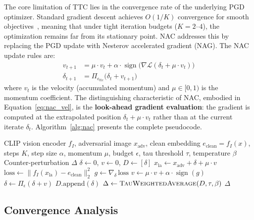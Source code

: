 \documentclass[pdflatex,sn-basic,Numbered]{sn-jnl}
\theoremstyle{thmstyleone}
\theoremstyle{thmstyletwo}
\theoremstyle{thmstylethree}
\begin{document}
The core limitation of TTC lies in the convergence rate of the underlying PGD optimizer. Standard gradient descent achieves $O(1/K)$ convergence for smooth objectives~\cite{nesterov1983method}, meaning that under tight iteration budgets ($K=2$--$4$), the optimization remains far from its stationary point. NAC addresses this by replacing the PGD update with Nesterov accelerated gradient (NAG). The NAC update rules are:
\begin{align}
v_{t+1} &= \mu \cdot v_t + \alpha \cdot \operatorname{sign}\!\big(\nabla \mathcal{L}(\delta_t + \mu \cdot v_t)\big) \label{eq:nac_vel} \\
\delta_{t+1} &= \Pi_{\epsilon_{\text{ttc}}}\!\big(\delta_t + v_{t+1}\big) \label{eq:nac_update}
\end{align}
where $v_t$ is the velocity (accumulated momentum) and $\mu \in [0, 1)$ is the momentum coefficient. The distinguishing characteristic of NAC, embodied in Equation~\ref{eq:nac_vel}, is the \textbf{look-ahead gradient evaluation}: the gradient is computed at the extrapolated position $\delta_t + \mu \cdot v_t$ rather than at the current iterate $\delta_t$. Algorithm~\ref{alg:nac} presents the complete pseudocode.

\begin{algorithm}[ht]
\caption{NAC: Nesterov Accelerated Counterattack}\label{alg:nac}
\begin{algorithmic}[1]
\Require CLIP vision encoder $f_I$, adversarial image $x_{\text{adv}}$, clean embedding $e_{\text{clean}}=f_I(x)$, steps $K$, step size $\alpha$, momentum $\mu$, budget $\epsilon$, tau threshold $\tau$, temperature $\beta$
\Ensure Counter-perturbation $\Delta$
\State $\delta \leftarrow 0$, $v \leftarrow 0$, $D \leftarrow [\delta]$
    \State $x_{\text{la}} \leftarrow x_{\text{adv}} + \delta + \mu \cdot v$ 
    \State $\text{loss} \leftarrow \big\|f_I(x_{\text{la}}) - e_{\text{clean}}\big\|^2_2$
    \State $g \leftarrow \nabla_\delta \,\text{loss}$
    \State $v \leftarrow \mu \cdot v + \alpha \cdot \operatorname{sign}(g)$ 
    \State $\delta \leftarrow \Pi_{\epsilon}(\delta + v)$
    \State $D.\text{append}(\delta)$
\EndFor
\State $\Delta \leftarrow \textsc{TauWeightedAverage}(D, \tau, \beta)$
\State \Return $\Delta$
\end{algorithmic}
\end{algorithm}

\subsection{Convergence Analysis}
\end{document}
